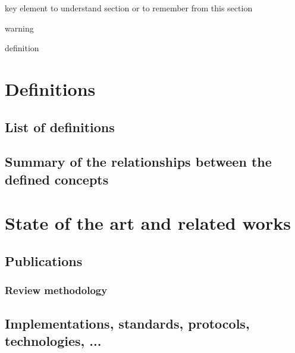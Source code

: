 \begin{bclogo}[arrondi=0.1, logo=\bccle, couleur=grey,noborder=true]{key element to understand section or to remember from this section}
    \lipsum[1-1]
\end{bclogo}

\begin{bclogo}[arrondi=0.1, logo=\bcbombe, couleur=grey,noborder=true]{warning}
    \lipsum[1-1]
\end{bclogo}

\begin{bclogo}[arrondi=0.1, logo=\bcbook, couleur=grey,noborder=true]{definition}
    \lipsum[1-1]
\end{bclogo}

\section{Definitions}%
\subsection{List of definitions}
\subsection{Summary of the relationships between the defined concepts}
\section{State of the art and related works}
\subsection{Publications}%
\subsubsection{Review methodology}%
\subsection{Implementations, standards, protocols, technologies, ...}
